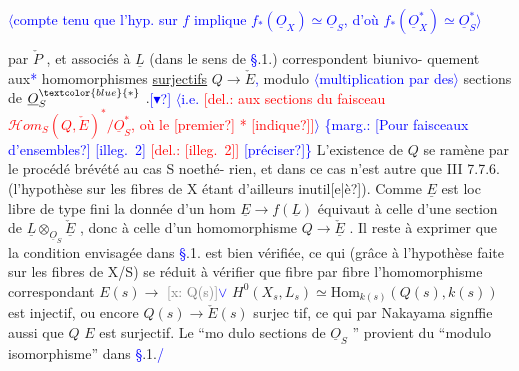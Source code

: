 \documentclass[11pt]{article}
\newcommand{\scanpage}[1]{\par\bigskip\noindent{\small\sffamily[scan #1]}\par}
\newcommand{\mspage}[1]{{\small\sffamily[p.\,#1]}}
\newcommand{\hand}[1]{\textcolor{blue}{#1}}
\newcommand{\inserted}[2][]{\textcolor{blue}{$\langle$#2$\rangle$}}
\newcommand{\margin}[1]{\textcolor{blue}{\{\textsf{marg.:} #1\}}}
\newcommand{\deleted}[1]{\textcolor{red}{[\textsf{del.:} #1]}}
\newcommand{\xout}[1]{\textcolor{gray}{[\textsf{x:} #1]}}
\newcommand{\uline}[1]{\underline{#1}}
\newcommand{\unsure}[1]{[#1?]}
\newcommand{\illegible}[1]{[\textsf{illeg.\ #1}]}
\begin{document}
\mspage{124}

\clearpage
\scanpage{25/125}
\inserted{compte tenu que l'hyp. sur $f$ implique $f_*(\underline{O}_X)\simeq\underline{O}_S$, d'où $f_*(\underline{O}_X^*)\simeq\underline{O}_S^*$}
\mspage{\hand{28}}

par $\check{P}$ , et associés à $\underline{L}$ (dans le sens de \hand{\S}.1.) correspondent biunivo-%
quement aux\hand{*} homomorphismes \uline{surjectifs} $Q\longrightarrow\check{E}$\hand{,} modulo \inserted{multiplication par des} sections de $\underline{O}_S^{\hand{*}}$ .\hand{\unsure{$\blacktriangledown$}}
\inserted{i.e. \deleted{aux sections du faisceau $\mathcal{H}om_S(Q,\check{E})^*/\underline{O}_S^*$, où le \unsure{premier} * \unsure{indique}}}
\margin{\unsure{Pour faisceaux d'ensembles} \illegible{2} \deleted{\illegible{2}} \unsure{préciser}}
L'existence de $Q$ se ramène par le procédé brévété au cas S noethé-%
rien, et dans ce cas n'est autre que III 7.7.6. (l'hypothèse sur les
fibres de X étant d'ailleurs inutil\unsure{e|è}). Comme $\underline{E}$ est loc libre de type fini
la donnée d'un hom $\underline{E}\longrightarrow f(\underline{L})$ équivaut à celle d'une section de
$\underline{L}\otimes_{\underline{O}_S}\check{\underline{E}}$ , donc à celle d'un homomorphisme $Q\longrightarrow\check{\underline{E}}$ . Il reste à exprimer
que la condition envisagée dans \hand{\S}.1. est bien vérifiée, ce qui (grâce à
l'hypothèse faite sur les fibres de X/S) se réduit à vérifier que
fibre par fibre l'homomorphisme correspondant $E(s)\longrightarrow$ \xout{Q(s)}\hand{$\vee$}
$H^0(X_s,L_s)\simeq\mathrm{Hom}_{k(s)}(Q(s),k(s))$ est injectif, ou encore $Q(s)\longrightarrow\check{E}(s)$ surjec%
tif, ce qui par Nakayama signffie aussi que $Q$ \quad $E$ est surjectif. Le ``mo
dulo sections de $\underline{O}_S$ '' provient du ``modulo isomorphisme'' dans \hand{\S}.1.\hand{/}
\end{document}
